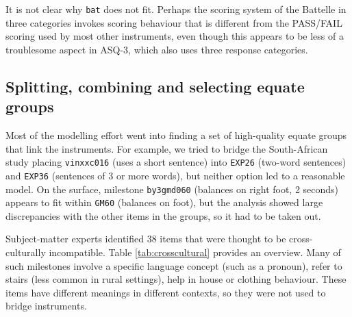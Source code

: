 \documentclass[
]{book}
\begin{document}
It is not clear why \texttt{bat} does not fit. Perhaps the scoring system of the Battelle in three categories invokes scoring behaviour that is different from the PASS/FAIL scoring used by most other instruments, even though this appears to be less of a troublesome aspect in ASQ-3, which also uses three response categories.

\hypertarget{splitting-combining-and-selecting-equate-groups}{%
\subsection{Splitting, combining and selecting equate groups}\label{splitting-combining-and-selecting-equate-groups}}

Most of the modelling effort went into finding a set of high-quality equate groups that link the instruments. For example, we tried to bridge the South-African study placing \texttt{vinxxc016} (uses a short sentence) into \texttt{EXP26} (two-word sentences) and \texttt{EXP36} (sentences of 3 or more words), but neither option led to a reasonable model. On the surface, milestone \texttt{by3gmd060} (balances on right foot, 2 seconds) appears to fit within \texttt{GM60} (balances on foot), but the analysis showed large discrepancies with the other items in the groups, so it had to be taken out.

Subject-matter experts identified 38 items that were thought to be cross-culturally incompatible. Table \ref{tab:crosscultural} provides an overview. Many of such milestones involve a specific language concept (such as a pronoun), refer to stairs (less common in rural settings), help in house or clothing behaviour. These items have different meanings in different contexts, so they were not used to bridge instruments.
\end{document}
